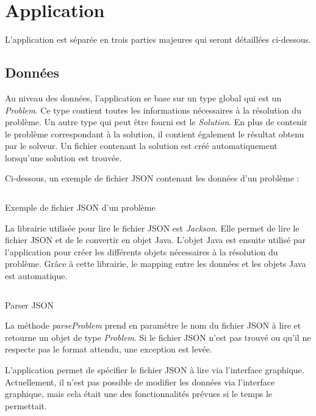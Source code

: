 \section{Application}

L'application est séparée en trois parties majeures qui seront détaillées ci-dessous.

\subsection{Données}
Au niveau des données, l'application se base sur un type global qui est un \textit{Problem}. Ce type contient toutes les informations nécessaires à la résolution du problème. Un autre type qui peut être fourni est le \textit{Solution}. En plus de contenir le problème correspondant à la solution, il contient également le résultat obtenu par le solveur. Un fichier contenant la solution est créé automatiquement lorsqu'une solution est trouvée.

Ci-dessous, un exemple de fichier JSON contenant les données d'un problème :

\begin{listing}[H]
    \inputminted{json}{assets/figures/example.json}
    \caption{Exemple de fichier JSON d'un problème}
\end{listing}


La librairie utilisée pour lire le fichier JSON est \textit{Jackson}. Elle permet de lire le fichier JSON et de le convertir en objet Java. L'objet Java est ensuite utilisé par l'application pour créer les différents objets nécessaires à la résolution du problème. Grâce à cette librairie, le mapping entre les données et les objets Java est automatique.

\begin{listing}[H]
    \inputminted{java}{assets/figures/parser.java}
    \caption{Parser JSON}
\end{listing}

La méthode \textit{parseProblem} prend en paramètre le nom du fichier JSON à lire et retourne un objet de type \textit{Problem}. Si le fichier JSON n'est pas trouvé ou qu'il ne respecte pas le format attendu, une exception est levée.

L'application permet de spécifier le fichier JSON à lire via l'interface graphique. Actuellement, il n'est pas possible de modifier les données via l'interface graphique, mais cela était une des fonctionnalités prévues si le temps le permettait.

